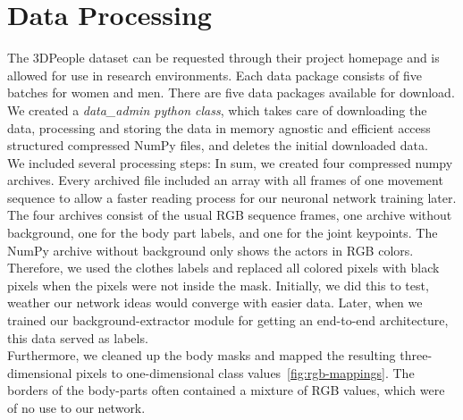 \section{Data Processing}
The 3DPeople dataset can be requested through their project homepage and is allowed for use in research
environments.
Each data package consists of five batches for women and men. There are five data packages available for download.
We created a \textit{data\_admin python class}, which takes care of downloading the data, processing and storing the
data
in memory agnostic and efficient access structured compressed NumPy files, and deletes the initial downloaded data.\\
We included several processing steps:
In sum, we created four compressed numpy archives.
Every archived file included an array with all frames of one movement sequence to allow a faster reading process for
our neuronal network training later.
The four archives consist of the usual RGB sequence frames, one archive without background, one for the body part
labels,
and one for the joint keypoints.
The NumPy archive without background only shows the actors in RGB colors.
Therefore, we used the clothes labels and replaced all colored pixels with black pixels when the pixels were not
inside the mask.
Initially, we did this to test, weather our network ideas would converge with easier data.
Later, when we trained our background-extractor module for getting an end-to-end architecture, this data served as
labels.\\
Furthermore, we cleaned up the body masks and mapped the resulting three-dimensional pixels to one-dimensional class
values~\autoref{fig:rgb-mappings}.
The borders of the body-parts often contained a mixture of RGB values, which were of no use to our network.\\
